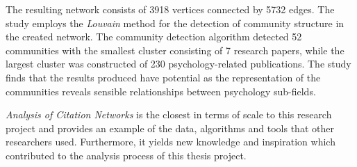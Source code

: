 The resulting network consists of 3918 vertices connected by 5732 edges. The study employs the \textit{Louvain} method for the detection of community structure in the created network. The community detection algorithm detected 52 communities with the smallest cluster consisting of 7 research papers, while the largest cluster was constructed of 230 psychology-related publications. The study finds that the results produced have potential as the representation of the communities reveals sensible relationships between psychology sub-fields.

\textit{Analysis of Citation Networks} is the closest in terms of scale to this research project and provides an example of the data, algorithms and tools that other researchers used. Furthermore, it yields new knowledge and inspiration which contributed to the analysis process of this thesis project.
\fi